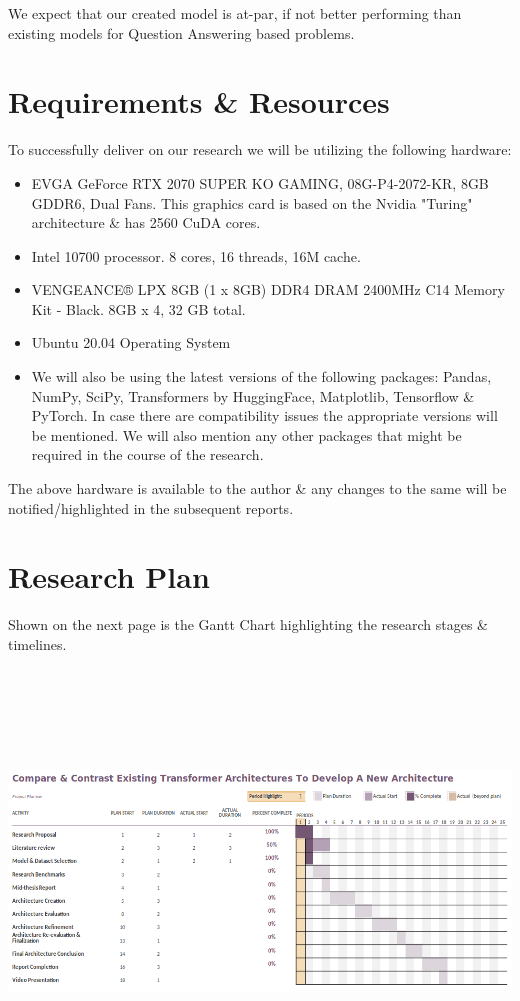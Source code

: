 \documentclass[11pt]{article}
\begin{document}
	We expect that our created model is at-par, if not better performing than existing models for Question Answering based problems.
	\section{Requirements \& Resources}\label{resources}
	
	To successfully deliver on our research we will be utilizing the following hardware:
	\begin{itemize}
		\item EVGA GeForce RTX 2070 SUPER KO GAMING, 08G-P4-2072-KR, 8GB GDDR6, Dual Fans\citep{evga}. This graphics card is based on the Nvidia "Turing" architecture \& has 2560 CuDA cores.
		\item Intel 10700 processor. 8 cores, 16 threads, 16M cache\citep{intel}.
		\item VENGEANCE® LPX 8GB (1 x 8GB) DDR4 DRAM 2400MHz C14 Memory Kit - Black\citep{Ram}. 8GB x 4, 32 GB total.
		\item Ubuntu 20.04 Operating System
		\item We will also be using the latest versions of the following packages: Pandas, NumPy, SciPy, Transformers by HuggingFace, Matplotlib, Tensorflow \& PyTorch. In case there are compatibility issues the appropriate versions will be mentioned. We will also mention any other packages that might be required in the course of the research.
	\end{itemize}
	
	
	The above hardware is available to the author \& any changes to the same will be notified/highlighted in the subsequent reports.
	\section{Research Plan}\label{plan}
	
	Shown on the next page is the Gantt Chart highlighting the research stages \& timelines.\\
	\includegraphics[width=180mm,height=120mm,angle=90]{g2.png}
	\newpage
	
	
\end{document}
